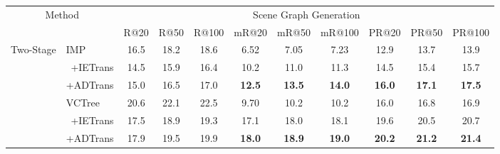 \documentclass[letterpaper]{article} %
\begin{document}
\begin{table}[]
\tabcolsep=0.08cm

\begin{tabular}{cr|ccccccccc}
\hline
\multicolumn{2}{c|}{\multirow{2}{*}{Method}}                                      & \multicolumn{9}{c}{Scene Graph Generation}                                                                                                                    \\ \cline{3-11}
\multicolumn{2}{c|}{}                                                             & R@20 & R@50 & \multicolumn{1}{c|}{R@100} & mR@20         & mR@50         & \multicolumn{1}{c|}{mR@100}        & PR@20         & PR@50         & PR@100        \\ \hline
\multicolumn{1}{c|}{\multirow{12}{*}{Two-Stage}} & \multicolumn{1}{l|}{IMP \cite{Xu_2017_CVPR}}       & 16.5 & 18.2 & \multicolumn{1}{c|}{18.6}  & 6.52          & 7.05          & \multicolumn{1}{c|}{7.23}          & 12.9          & 13.7          & 13.9          \\
\multicolumn{1}{c|}{}                            &  \quad +IETrans \cite{zhang2022fine}                      & 14.5 & 15.9 & \multicolumn{1}{c|}{16.4}  & 10.2          & 11.0          & \multicolumn{1}{c|}{11.3}          & 14.5          & 15.4          & 15.7          \\
\multicolumn{1}{c|}{}                            &  \multicolumn{1}{l|}{\quad +ADTrans }                    & 15.0 & 16.5 & \multicolumn{1}{c|}{17.0}  & \textbf{12.5} & \textbf{13.5} & \multicolumn{1}{c|}{\textbf{14.0}} & \textbf{16.0} & \textbf{17.1} & \textbf{17.5} \\ \cline{2-11}
\multicolumn{1}{c|}{}                            & \multicolumn{1}{l|}{VCTree \cite{Tang_2019_CVPR}}    & 20.6 & 22.1 & \multicolumn{1}{c|}{22.5}  & 9.70          & 10.2          & \multicolumn{1}{c|}{10.2}          & 16.0          & 16.8          & 16.9          \\
\multicolumn{1}{c|}{}                            & \quad +IETrans \cite{zhang2022fine}                      & 17.5 & 18.9 & \multicolumn{1}{c|}{19.3}  & 17.1          & 18.0          & \multicolumn{1}{c|}{18.1}          & 19.6          & 20.5          & 20.7          \\
\multicolumn{1}{c|}{}                            & \multicolumn{1}{l|}{\quad +ADTrans }                        & 17.9 & 19.5 & \multicolumn{1}{c|}{19.9}  & \textbf{18.0} & \textbf{18.9} & \multicolumn{1}{c|}{\textbf{19.0}} & \textbf{20.2} & \textbf{21.2} & \textbf{21.4} \\ \cline{2-11}

\end{tabular}
\end{table}
\end{document}
